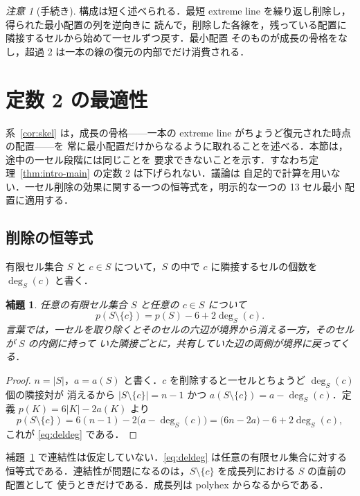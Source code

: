 \documentclass[11pt]{article}
\theoremstyle{plain}
\newtheorem{lemma}[theorem]{補題}
\theoremstyle{definition}
\theoremstyle{remark}
\newtheorem{remark}[theorem]{注意}
\newcommand{\sm}{\setminus}
\newcommand{\dg}{\operatorname{deg}}
\begin{document}
\begin{remark}[手続き]\label{rem:algorithm}
構成は短く述べられる．最短 extreme line を繰り返し削除し，得られた最小配置の列を逆向きに
読んで，削除した各線を，残っている配置に隣接するセルから始めて一セルずつ戻す．最小配置
そのものが成長の骨格をなし，超過 2 は一本の線の復元の内部でだけ消費される．
\end{remark}


\section{定数 2 の最適性}\label{sec:sharp}

系~\ref{cor:skel} は，成長の骨格——一本の extreme line がちょうど復元された時点の配置——を
常に最小配置だけからなるように取れることを述べる．本節は，途中の一セル段階には同じことを
要求できないことを示す．すなわち定理~\ref{thm:intro-main} の定数 2 は下げられない．議論は
自足的で計算を用いない．一セル削除の効果に関する一つの恒等式を，明示的な一つの 13 セル最小
配置に適用する．

\subsection{削除の恒等式}\label{sec:8.1}

有限セル集合 \(S\) と \(c\in S\) について，\(S\) の中で \(c\) に隣接するセルの個数を
\(\dg_{S}(c)\) と書く．

\begin{lemma}\label{lem:deldeg}
任意の有限セル集合 \(S\) と任意の \(c\in S\) について
\begin{equation}\label{eq:deldeg}
   p(S\sm\{c\})=p(S)-6+2\dg_{S}(c).
\end{equation}
言葉では，一セルを取り除くとそのセルの六辺が境界から消える一方，そのセルが \(S\) の内側に持って
いた隣接ごとに，共有していた辺の両側が境界に戻ってくる．
\end{lemma}

\begin{proof}
\(n=|S|\)，\(a=a(S)\) と書く．\(c\) を削除すると一セルとちょうど \(\dg_{S}(c)\) 個の隣接対が
消えるから \(|S\sm\{c\}|=n-1\) かつ \(a(S\sm\{c\})=a-\dg_{S}(c)\)．定義
\(p(K)=6|K|-2a(K)\) より
\[
   p(S\sm\{c\})=6(n-1)-2\bigl(a-\dg_{S}(c)\bigr)=\bigl(6n-2a\bigr)-6+2\dg_{S}(c),
\]
これが \eqref{eq:deldeg} である．
\end{proof}

補題~\ref{lem:deldeg} で連結性は仮定していない．\eqref{eq:deldeg} は任意の有限セル集合に対する
恒等式である．連結性が問題になるのは，\(S\sm\{c\}\) を成長列における \(S\) の直前の配置として
使うときだけである．成長列は polyhex からなるからである．
\end{document}
